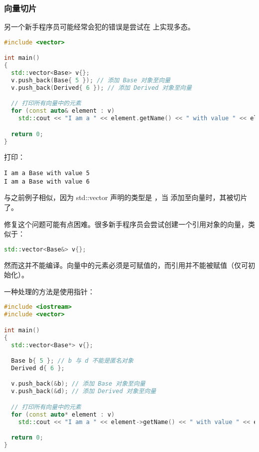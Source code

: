 \documentclass[../../LearnCpp.tex]{subfiles}
\begin{document}
\subsubsection*{向量切片}

另一个新手程序员可能经常会犯的错误是尝试在  上实现多态。

\begin{lstlisting}[language=C++]
#include <vector>

int main()
{
  std::vector<Base> v{};
  v.push_back(Base{ 5 }); // 添加 Base 对象至向量
  v.push_back(Derived{ 6 }); // 添加 Derived 对象至向量

  // 打印所有向量中的元素
  for (const auto& element : v)
    std::cout << "I am a " << element.getName() << " with value " << element.getValue() << '\n';

  return 0;
}
\end{lstlisting}

打印：

\begin{lstlisting}
I am a Base with value 5
I am a Base with value 6
\end{lstlisting}

与之前例子相似，因为 std::vector 声明的类型是 ，当  添加至向量时，其被切片了。

修复这个问题可能有点困难。很多新手程序员会尝试创建一个引用对象的向量，类似于：

\begin{lstlisting}[language=C++]
std::vector<Base&> v{};
\end{lstlisting}

然而这并不能编译。向量中的元素必须是可赋值的，而引用并不能被赋值（仅可初始化）。

一种处理的方法是使用指针：

\begin{lstlisting}[language=C++]
#include <iostream>
#include <vector>

int main()
{
  std::vector<Base*> v{};

  Base b{ 5 }; // b 与 d 不能是匿名对象
  Derived d{ 6 };

  v.push_back(&b); // 添加 Base 对象至向量
  v.push_back(&d); // 添加 Derived 对象至向量

  // 打印所有向量中的元素
  for (const auto* element : v)
    std::cout << "I am a " << element->getName() << " with value " << element->getValue() << '\n';

  return 0;
}
\end{lstlisting}
\end{document}
